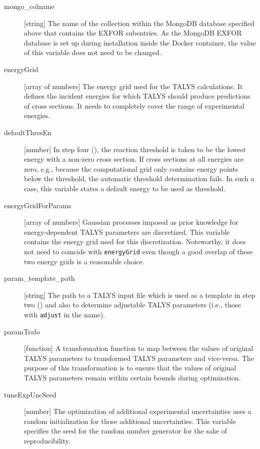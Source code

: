 \documentclass[12pt,a4paper]{scrartcl}
\begin{document}
\begin{description}
 \item[mongo\_colname]
 [string] The name of the collection within the MongoDB database specified above that contains the EXFOR subentries.
 As the MongoDB EXFOR database is set up during installation inside the Docker container, the value of this variable does not need to be changed.
 
 \item[energyGrid]
 [array of numbers] The energy grid used for the TALYS calculations.
 It defines the incident energies for which TALYS should produce predictions of cross sections.
 It needs to completely cover the range of experimental energies.
 
 \item[defaultThresEn]
 [number] In step four (), the reaction threshold is taken to be the lowest energy with a non-zero cross section.
 If cross sections at all energies are zero, e.g., because the computational grid only contains energy points below the threshold, the automatic threshold determination fails.
 In such a case, this variable states a default energy to be used as threshold.
 
 \item[energyGridForParams]
 [array of numbers] Gaussian processes imposed as prior knowledge for energy-dependent TALYS parameters are discretized.
 This variable contains the energy grid used for this discretization.
 Noteworthy, it does not need to coincide with \verb#energyGrid# even though a good overlap of these two energy grids is a reasonable choice.  
 
 \item[param\_template\_path]
 [string] The path to a TALYS input file which is used as a template in step two () and also to determine adjustable TALYS parameters (i.e., those with \verb#adjust# in the name).
 
 \item[paramTrafo]
 [function] A transformation function to map between the values of original TALYS parameters to transformed TALYS parameters and vice-versa.
 The purpose of this transformation is to ensure that the values of original TALYS parameters remain within certain bounds during optimization.
 
 \item[tuneExpUncSeed]
 [number] The optimization of additional experimental uncertainties uses a random initialization for those additional uncertainties.
 This variable specifies the seed for the random number generator for the sake of reproducibility.
 

\end{description}
\end{document}
